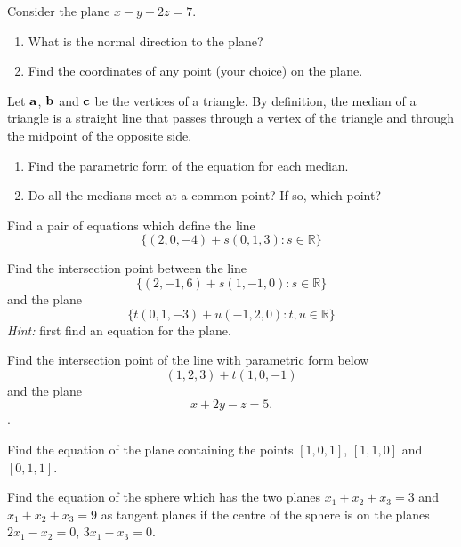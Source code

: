 \begin{problem}
\label{2009_a2_3}
Consider the plane $x-y+2z=7$.
\begin{enumerate}
\item What is the normal direction to the plane?
\item Find the coordinates of any point (your choice) on the plane.
\end{enumerate}
\end{problem}

\begin{problem}
\label{op1_26}
Let $\aa$, $\bb$ and $\cc$ be the vertices of a triangle. By definition, the
median of a triangle is a straight line that passes through a vertex of the
triangle and through the midpoint of the opposite side.
{\begin{enumerate}
\renewcommand{\labelenumi}{(\roman{enumi})}
\item Find the parametric form of the equation for each median.
\item Do all the medians meet at a common point? If so, which point?
\end{enumerate}}
\end{problem}

\begin{problem}
\label{2008_a2_3} Find a pair of equations which define the
line 
\[
\{ (2,0,-4) + s(0,1,3): s \in \mathbb{R} \}
\]
\end{problem}

\begin{problem}
\label{2008_a2_4} Find the intersection point between the line
\[
\{ (2,-1,6) + s(1,-1,0): s \in \mathbb{R} \}
\]
and the plane 
\[
\{ t(0,1,-3) + u(-1,2,0): t,u  \in \mathbb{R} \}
\]
{\em Hint:} first find an equation for the plane. 
\end{problem}

\begin{problem}
\label{2009_a2_4}
Find the intersection point of the line with parametric form
below
\[
(1,2,3) + t (1,0,-1)
\]
and the plane
\[
x + 2y - z = 5.
\].
\end{problem}

\begin{problem}
\label{op1_27}
Find the equation of the plane containing the points $[1,0,1]$, $[1,1,0]$ and
$[0,1,1]$.
\end{problem}

\begin{problem}
\label{op1_28}
Find the equation of the sphere which has the two planes $x_1+x_2+x_3=3$ and
$x_1+x_2+x_3=9$ as tangent planes if the centre of the sphere is on the planes
$2x_1-x_2=0$, $3x_1-x_3=0$.
\end{problem}

